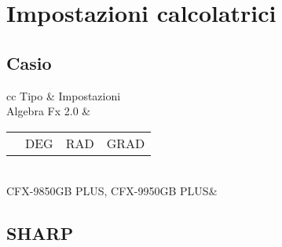 \chapter{Impostazioni calcolatrici}
\section{Casio}
\begin{tabular}{cc}
\toprule
Tipo	& Impostazioni \\ 
\midrule 
Algebra Fx 2.0	&  \begin{tabular}{llll}
	\tastosetup\tastoangle&DEG&RAD&GRAD\\ 
\end{tabular}\\
CFX-9850GB PLUS, CFX-9950GB PLUS&\\ 
\bottomrule
\end{tabular}
\section{SHARP}

